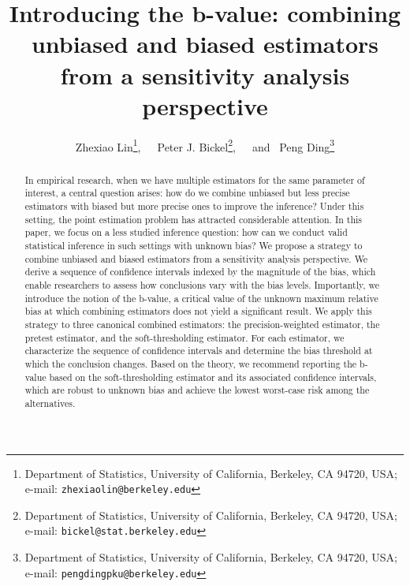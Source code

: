 \documentclass[11pt]{article}
\numberwithin{equation}{section}
\theoremstyle{definition}
\begin{document}
\setlength{\abovedisplayskip}{5pt}
\setlength{\belowdisplayskip}{5pt}
\setlength{\abovedisplayshortskip}{5pt}
\setlength{\belowdisplayshortskip}{5pt}
\hypersetup{colorlinks,breaklinks,urlcolor=blue,linkcolor=blue}



\title{\LARGE Introducing the b-value: combining unbiased and biased estimators from a sensitivity analysis perspective }

\author{Zhexiao Lin\thanks{Department of Statistics, University of California, Berkeley, CA 94720, USA; e-mail: {\tt zhexiaolin@berkeley.edu}},~~~Peter J. Bickel\thanks{Department of Statistics, University of California, Berkeley, CA 94720, USA; e-mail: {\tt bickel@stat.berkeley.edu}},~~~and~
Peng Ding\thanks{Department of Statistics, University of California, Berkeley, CA 94720, USA; e-mail: {\tt pengdingpku@berkeley.edu}}
}

\maketitle

\vspace{-1em}

\begin{abstract}
  In empirical research, when we have multiple estimators for the same parameter of interest, a central question arises: how do we combine unbiased but less precise estimators with biased but more precise ones to improve the inference? Under this setting, the point estimation problem has attracted considerable attention. In this paper, we focus on a less studied inference question: how can we conduct valid statistical inference in such settings with unknown bias? We propose a strategy to combine unbiased and biased estimators from a sensitivity analysis perspective. We derive a sequence of confidence intervals indexed by the magnitude of the bias, which enable researchers to assess how conclusions vary with the bias levels. Importantly, we introduce the notion of the b-value, a critical value of the unknown maximum relative bias at which combining estimators does not yield a significant result. We apply this strategy to three canonical combined estimators: the precision-weighted estimator, the pretest estimator, and the soft-thresholding estimator. For each estimator, we characterize the sequence of confidence intervals and determine the bias threshold at which the conclusion changes. Based on the theory, we recommend reporting the b-value based on the soft-thresholding estimator and its associated confidence intervals, which are robust to unknown bias and achieve the lowest worst-case risk among the alternatives.
\end{abstract}
\end{document}
